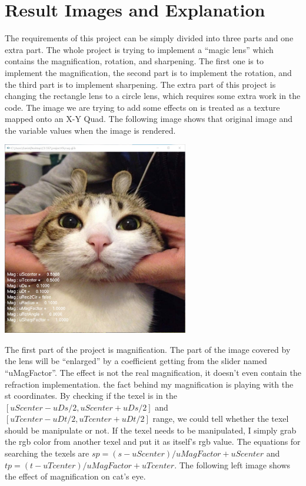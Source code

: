 \documentclass[letterpaper,14pt,titlepage,fleqn]{article}
\begin{document}
\section{Result Images and Explanation}
The requirements of this project can be simply divided into three parts and one extra part. The whole project is trying to implement a ``magic lens'' which contains the magnification, rotation, and sharpening. The first one is to implement the magnification, the second part is to implement the rotation, and the third part is to implement sharpening. The extra part of this project is changing the rectangle lens to a circle lens, which requires some extra work in the code. The image we are trying to add some effects on is treated as a texture mapped onto an X-Y Quad. The following image shows that original image and the variable values when the image is rendered. 
\begin{center}
	\includegraphics[width=3.2in]{origin.jpg}
\end{center}
The first part of the project is magnification. The part of the image covered by the lens will be ``enlarged'' by a coefficient getting from the slider named ``uMagFactor''. The effect is not the real magnification, it doesn't even contain the refraction implementation. the fact behind my magnification is playing with the st coordinates. By checking if the texel is in the $[uScenter-uDs/2 , uScenter+uDs/2]$ and $[uTcenter-uDt/2 , uTcenter+uDt/2]$ range, we could tell whether the texel should be manipulate or not. If the texel needs to be manipulated, I simply grab the rgb color from another texel and put it as itself's rgb value. The equations for searching the texels are $sp = (s - uScenter) / uMagFactor + uScenter$ and $tp = (t - uTcenter) / uMagFactor + uTcenter$. The following left image shows the effect of magnification on cat's eye.
\end{document}
